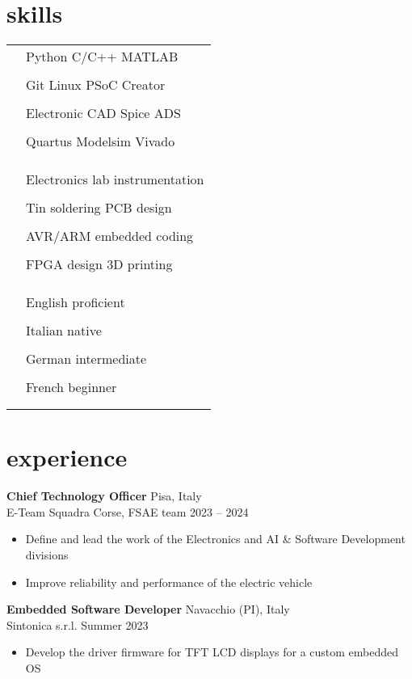 \documentclass[12pt]{article}
\newcommand{\entry}[4]{{{\textbf{#1}}} \hfill #3 \\ #2 \hfill #4}
\newcommand{\tableentry}[3]{\textsc{#1} & #2\expandafter\ifstrequal\expandafter{#3}{}{\\}{\\[6pt]}}
\begin{document}
\begin{paracol}{2}
\switchcolumn

\section{skills}
\begin{supertabular}{rl}
  \tableentry{\footnotesize\faCode}{Python \textperiodcentered{} C/C++ \textperiodcentered{} MATLAB}{}
  \tableentry{}{Git \textperiodcentered{} Linux \textperiodcentered{} PSoC Creator}{}
  \tableentry{}{Electronic CAD \textperiodcentered{} Spice \textperiodcentered{} ADS}{}
  \tableentry{}{Quartus \textperiodcentered{} Modelsim \textperiodcentered{} Vivado}{}
  \tableentry{}{}{}

  \tableentry{\footnotesize\faBolt}{Electronics lab instrumentation}{}
  \tableentry{}{Tin soldering \textperiodcentered{} PCB design}
  {}
  \tableentry{}{AVR/ARM embedded coding}{}
  \tableentry{}{FPGA design \textperiodcentered{} 3D printing}{}
  \tableentry{}{}{}

  \tableentry{\footnotesize\faLanguage}{English \textperiodcentered{} proficient}{}
  \tableentry{}{Italian \textperiodcentered{} native}{}
  \tableentry{}{German \textperiodcentered{} intermediate}{}
  \tableentry{}{French \textperiodcentered{} beginner}{}
\end{supertabular}

\switchcolumn*

\section{experience}

\entry{Chief Technology Officer}{E-Team Squadra Corse, FSAE team}{Pisa, Italy}{2023 -- 2024}
\begin{itemize}[noitemsep,leftmargin=3.5mm,rightmargin=0mm,topsep=6pt]
  \item Define and lead the work of the Electronics and AI \& Software Development divisions
  \item Improve reliability and performance of the electric vehicle 
\end{itemize}

\smallskip

\entry{Embedded Software Developer}{Sintonica s.r.l.}{Navacchio (PI), Italy}{Summer 2023}
\begin{itemize}[noitemsep,leftmargin=3.5mm,rightmargin=0mm,topsep=6pt]
  \item Develop the driver firmware for TFT LCD displays for a custom embedded OS
\end{itemize}


\end{paracol}
\end{document}
